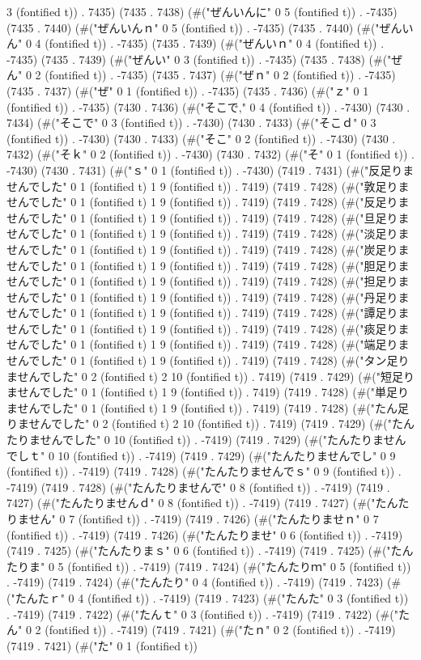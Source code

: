 3 (fontified t)) . 7435) (7435 . 7438) (#("ぜんいんに" 0 5 (fontified t)) . -7435) (7435 . 7440) (#("ぜんいんｎ" 0 5 (fontified t)) . -7435) (7435 . 7440) (#("ぜんいん" 0 4 (fontified t)) . -7435) (7435 . 7439) (#("ぜんいｎ" 0 4 (fontified t)) . -7435) (7435 . 7439) (#("ぜんい" 0 3 (fontified t)) . -7435) (7435 . 7438) (#("ぜん" 0 2 (fontified t)) . -7435) (7435 . 7437) (#("ぜｎ" 0 2 (fontified t)) . -7435) (7435 . 7437) (#("ぜ" 0 1 (fontified t)) . -7435) (7435 . 7436) (#("ｚ" 0 1 (fontified t)) . -7435) (7430 . 7436) (#("そこで," 0 4 (fontified t)) . -7430) (7430 . 7434) (#("そこで" 0 3 (fontified t)) . -7430) (7430 . 7433) (#("そこｄ" 0 3 (fontified t)) . -7430) (7430 . 7433) (#("そこ" 0 2 (fontified t)) . -7430) (7430 . 7432) (#("そｋ" 0 2 (fontified t)) . -7430) (7430 . 7432) (#("そ" 0 1 (fontified t)) . -7430) (7430 . 7431) (#("ｓ" 0 1 (fontified t)) . -7430) (7419 . 7431) (#("反足りませんでした" 0 1 (fontified t) 1 9 (fontified t)) . 7419) (7419 . 7428) (#("敦足りませんでした" 0 1 (fontified t) 1 9 (fontified t)) . 7419) (7419 . 7428) (#("反足りませんでした" 0 1 (fontified t) 1 9 (fontified t)) . 7419) (7419 . 7428) (#("旦足りませんでした" 0 1 (fontified t) 1 9 (fontified t)) . 7419) (7419 . 7428) (#("淡足りませんでした" 0 1 (fontified t) 1 9 (fontified t)) . 7419) (7419 . 7428) (#("炭足りませんでした" 0 1 (fontified t) 1 9 (fontified t)) . 7419) (7419 . 7428) (#("胆足りませんでした" 0 1 (fontified t) 1 9 (fontified t)) . 7419) (7419 . 7428) (#("担足りませんでした" 0 1 (fontified t) 1 9 (fontified t)) . 7419) (7419 . 7428) (#("丹足りませんでした" 0 1 (fontified t) 1 9 (fontified t)) . 7419) (7419 . 7428) (#("譚足りませんでした" 0 1 (fontified t) 1 9 (fontified t)) . 7419) (7419 . 7428) (#("痰足りませんでした" 0 1 (fontified t) 1 9 (fontified t)) . 7419) (7419 . 7428) (#("端足りませんでした" 0 1 (fontified t) 1 9 (fontified t)) . 7419) (7419 . 7428) (#("タン足りませんでした" 0 2 (fontified t) 2 10 (fontified t)) . 7419) (7419 . 7429) (#("短足りませんでした" 0 1 (fontified t) 1 9 (fontified t)) . 7419) (7419 . 7428) (#("単足りませんでした" 0 1 (fontified t) 1 9 (fontified t)) . 7419) (7419 . 7428) (#("たん足りませんでした" 0 2 (fontified t) 2 10 (fontified t)) . 7419) (7419 . 7429) (#("たんたりませんでした" 0 10 (fontified t)) . -7419) (7419 . 7429) (#("たんたりませんでしｔ" 0 10 (fontified t)) . -7419) (7419 . 7429) (#("たんたりませんでし" 0 9 (fontified t)) . -7419) (7419 . 7428) (#("たんたりませんでｓ" 0 9 (fontified t)) . -7419) (7419 . 7428) (#("たんたりませんで" 0 8 (fontified t)) . -7419) (7419 . 7427) (#("たんたりませんｄ" 0 8 (fontified t)) . -7419) (7419 . 7427) (#("たんたりません" 0 7 (fontified t)) . -7419) (7419 . 7426) (#("たんたりませｎ" 0 7 (fontified t)) . -7419) (7419 . 7426) (#("たんたりませ" 0 6 (fontified t)) . -7419) (7419 . 7425) (#("たんたりまｓ" 0 6 (fontified t)) . -7419) (7419 . 7425) (#("たんたりま" 0 5 (fontified t)) . -7419) (7419 . 7424) (#("たんたりｍ" 0 5 (fontified t)) . -7419) (7419 . 7424) (#("たんたり" 0 4 (fontified t)) . -7419) (7419 . 7423) (#("たんたｒ" 0 4 (fontified t)) . -7419) (7419 . 7423) (#("たんた" 0 3 (fontified t)) . -7419) (7419 . 7422) (#("たんｔ" 0 3 (fontified t)) . -7419) (7419 . 7422) (#("たん" 0 2 (fontified t)) . -7419) (7419 . 7421) (#("たｎ" 0 2 (fontified t)) . -7419) (7419 . 7421) (#("た" 0 1 (fontified t)) 